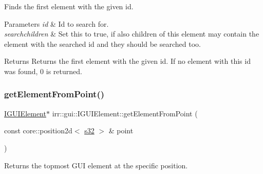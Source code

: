 Finds the first element with the given id. 


\begin{DoxyParams}{Parameters}
{\em id} & Id to search for. \\
\hline
{\em searchchildren} & Set this to true, if also children of this element may contain the element with the searched id and they should be searched too. \\
\hline
\end{DoxyParams}
\begin{DoxyReturn}{Returns}
Returns the first element with the given id. If no element with this id was found, 0 is returned. 
\end{DoxyReturn}
\mbox{\label{classirr_1_1gui_1_1IGUIElement_ae49f8a5228ce0c18e0c98becf74ee56a}} 
\subsubsection{\texorpdfstring{get\+Element\+From\+Point()}{getElementFromPoint()}\hspace{0.1cm}{\footnotesize\ttfamily [1/2]}}
{\footnotesize\ttfamily \hyperlink{classirr_1_1gui_1_1IGUIElement}{I\+G\+U\+I\+Element}$\ast$ irr\+::gui\+::\+I\+G\+U\+I\+Element\+::get\+Element\+From\+Point (\begin{DoxyParamCaption}\item[{const core\+::position2d$<$ \hyperlink{namespaceirr_ac66849b7a6ed16e30ebede579f9b47c6}{s32} $>$ \&}]{point }\end{DoxyParamCaption})\hspace{0.3cm}{\ttfamily [inline]}}



Returns the topmost G\+UI element at the specific position. 

